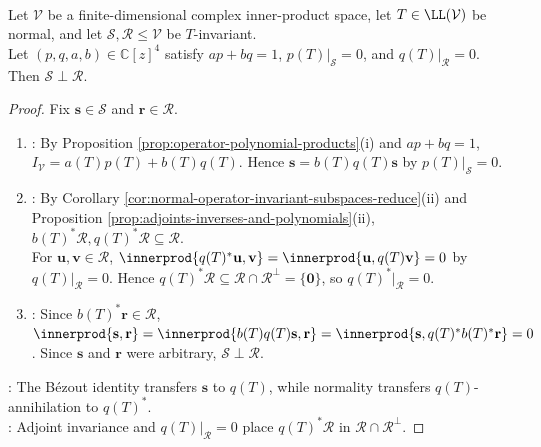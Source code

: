 \begin{proposition} \label{prop:normal-coprime-invariant-subspaces-orthogonal} \\
Let $\mathcal{V}$ be a finite-dimensional complex inner-product space, let $T\in\LL(\mathcal{V})$ be normal, and let $\mathcal{S},\mathcal{R}\leq\mathcal{V}$ be $T$-invariant.\\
Let $(p,q,a,b)\in\mathbb{C}[z]^4$ satisfy $ap+bq=1$, $p(T)|_{\mathcal{S}}=0$, and $q(T)|_{\mathcal{R}}=0$. Then $\mathcal{S}\perp\mathcal{R}$.
\begin{proof}
Fix $\mathbf{s}\in\mathcal{S}$ and $\mathbf{r}\in\mathcal{R}$.
\begin{enumerate}[label=(\roman*)]
\setlength{\itemsep}{0pt}
\item {}: By Proposition \ref{prop:operator-polynomial-products}(i) and $ap+bq=1$, $I_{\mathcal{V}}=a(T)p(T)+b(T)q(T)$. Hence $\mathbf{s}=b(T)q(T)\mathbf{s}$ by $p(T)|_{\mathcal{S}}=0$.
\item {}: By Corollary \ref{cor:normal-operator-invariant-subspaces-reduce}(ii) and Proposition \ref{prop:adjoints-inverses-and-polynomials}(ii), $b(T)^*\mathcal{R},q(T)^*\mathcal{R}\subseteq\mathcal{R}$.\\
For $\mathbf{u},\mathbf{v}\in\mathcal{R}$, $\innerprod{q(T)^*\mathbf{u},\mathbf{v}}=\innerprod{\mathbf{u},q(T)\mathbf{v}}=0$ by $q(T)|_{\mathcal{R}}=0$. Hence $q(T)^*\mathcal{R}\subseteq\mathcal{R}\cap\mathcal{R}^{\perp}=\{\mathbf{0}\}$, so $q(T)^*|_{\mathcal{R}}=0$.
\item {}: Since $b(T)^*\mathbf{r}\in\mathcal{R}$, $\innerprod{\mathbf{s},\mathbf{r}}=\innerprod{b(T)q(T)\mathbf{s},\mathbf{r}}=\innerprod{\mathbf{s},q(T)^*b(T)^*\mathbf{r}}=0$. Since $\mathbf{s}$ and $\mathbf{r}$ were arbitrary, $\mathcal{S}\perp\mathcal{R}$.
\end{enumerate}
: The Bézout identity transfers $\mathbf{s}$ to $q(T)$, while normality transfers $q(T)$-annihilation to $q(T)^*$.\\
: Adjoint invariance and $q(T)|_{\mathcal{R}}=0$ place $q(T)^*\mathcal{R}$ in $\mathcal{R}\cap\mathcal{R}^{\perp}$.
\end{proof}
\end{proposition}
